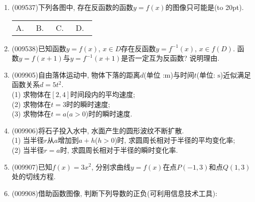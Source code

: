 \documentclass[10pt,a4paper]{article}
\newcommand{\bracket}[1]{(\hbox to #1pt{})}
\newcommand{\fourch}[4]{\par\begin{tabular}{p{.23\textwidth}p{.23\textwidth}p{.23\textwidth}p{.23\textwidth}}
A.~#1 &B.~#2& C.~#3& D.~#4
\end{tabular}}
\begin{document}
\begin{enumerate}[1.]
\item {\tiny (009537)}下列各图中, 存在反函数的函数$y=f(x)$的图像只可能是\bracket{20}.
\fourch{\begin{tikzpicture}[>=latex,samples=200,scale =0.7]
\draw [->] (-2,0) -- (0,0) node [below left] {$O$} -- (2,0) node [below right] {$x$};
\draw [->] (0,-0.5) -- (0,2) node [left] {$y$};
\draw [domain=-1.4:1.4] plot (\x, \x * \x);
\end{tikzpicture}}{\begin{tikzpicture}[>=latex,samples=200,scale =0.7]
\draw [->] (-2,0) -- (0,0) node [below left] {$O$} -- (2,0) node [below right] {$x$};
\draw [->] (0,-0.5) -- (0,2) node [left] {$y$};
\draw [domain=-2:-0.2] plot (\x, {-0.4/ \x});
\draw [domain=0.08:2] plot (\x, {0.1/\x+0.75});
\end{tikzpicture}}{\begin{tikzpicture}[>=latex,samples=200,scale =0.7]
\draw [->] (-2,0) -- (0,0) node [below left] {$O$} -- (2,0) node [below right] {$x$};
\draw [->] (0,-0.5) -- (0,2) node [left] {$y$};
\draw [domain=-2:2] plot (\x, {exp(\x)/4});
\end{tikzpicture}}{\begin{tikzpicture}[>=latex,samples=200,scale =0.7]
\draw [->] (-2,0) -- (0,0) node [below left] {$O$} -- (2,0) node [below right] {$x$};
\draw [->] (0,-0.5) -- (0,2) node [left] {$y$};
\draw (-2,2) -- (0,0) -- (2,1);
\end{tikzpicture}}
\item {\tiny (009538)}已知函数$y=f(x)$, $x\in D$存在反函数$y=f^{-1}(x)$, $x\in f(D)$. 函数$y=f(x+1)$与$y=f^{-1}(x+1)$是否一定互为反函数? 说明理由.
\item {\tiny (009905)}自由落体运动中, 物体下落的距离$d$(单位 :$\text{m}$)与时间$t$(单位: $\text{s}$)近似满足函数关系$d=5t^2$.\\
(1) 求物体在$[2, 4]$时间段内的平均速度;\\
(2) 求物体在$t=3$时的瞬时速度;\\
(3) 求物体在$t=a$($a>0$)时的瞬时速度.
\item {\tiny (009906)}将石子投入水中, 水面产生的圆形波纹不断扩散.\\
(1) 当半径$r$从$a$增加到$a+h$($h>0$)时, 求圆周长相对于半径的平均变化率;\\
(2) 当半径$r=a$时, 求圆周长相对于半径的瞬时变化率.
\item {\tiny (009907)}已知$f(x)=3x^2$, 分别求曲线$y=f(x)$在点$P(-1,3)$和点$Q(1,3)$处的切线方程.
\item {\tiny (009908)}借助函数图像, 判断下列导数的正负(可利用信息技术工具):\\

\end{enumerate}
\end{document}
